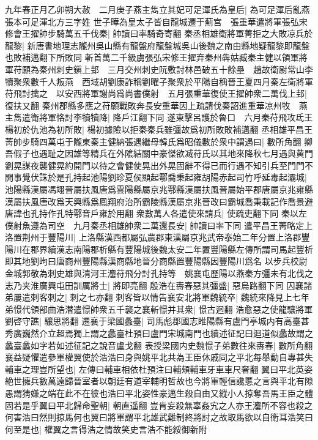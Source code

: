 九年春正月乙卯朔大赦　二月庚子燕主雋立其妃可足渾氏為皇后|{
	為可足渾后亂燕張本可足渾北方三字姓}
世子曄為皇太子皆自龍城遷于薊宫　張重華遣將軍張弘宋修會王擢帥步騎萬五千伐秦|{
	帥讀曰率騎奇寄翻}
秦丞相雄衛將軍菁拒之大敗凉兵於龍黎|{
	新唐書地理志隴州吳山縣有龍盤府龍盤城吳山後魏之南由縣地疑龍黎即龍盤也敗補邁翻下所敗同}
斬首萬二千級虜張弘宋修王擢弃秦州犇姑臧秦主健以領軍將軍苻願為秦州刺史鎭上邽　三月交州刺史阮敷討林邑破五十餘壘　趙故衛尉常山李犢聚衆數千人叛燕　西域胡劉康詐稱劉曜子聚衆於平陽自稱晉王夏四月秦左衛將軍苻飛討擒之　以安西將軍謝尚爲尚書僕射　五月張重華復使王擢帥衆二萬伐上邽|{
	復扶又翻}
秦州郡縣多應之苻願戰敗奔長安重華因上疏請伐秦詔進重華凉州牧　燕主雋遣衛將軍恪討李犢犢降|{
	降戶江翻下同}
遂東擊呂護於魯口　六月秦苻飛攻氐王楊初於仇池為初所敗|{
	楊初據險以拒秦秦兵雖彊故爲初所敗敗補邁翻}
丞相雄平昌王菁帥步騎四萬屯于隴東秦主健納張遇繼母韓氏爲昭儀數於衆中謂遇曰|{
	數所角翻}
卿吾假子也遇耻之因雄等精兵在外隂結關中豪傑欲㓕苻氏以其地來降秋七月遇與黄門劉晃謀夜襲健晃約開門以待之會健使晃出外晃固辭不得已而行遇不知引兵至門門不開事覺伏誅於是孔持起池陽劉珍夏侯顯起鄠喬秉起雍胡陽赤起司竹呼延毒起灞城|{
	池陽縣漢屬馮翊晉屬扶風唐爲雲陽縣屬京兆鄠縣漢屬扶風晉屬始平郡唐屬京兆雍縣漢屬扶風唐改爲天興縣爲鳳翔府治所霸陵縣漢屬京兆晉改曰霸城喬秉載記作喬景避唐諱也孔持作孔特鄠音戶雍於用翻}
衆數萬人各遣使來請兵|{
	使疏吏翻下同}
秦以左僕射魚遵為司空　九月秦丞相雄帥衆二萬還長安|{
	帥讀曰率下同}
遣平昌王菁略定上洛置荆州于豐陽川|{
	上洛縣漢西都屬弘農郡東漢屬京兆武帝泰始二年分置上洛郡豐陽川在郡界續漢志南陽郡析縣有豐陽城後魏太安二年置豐陽縣左傳所謂司馬起豐析即其地劉昫曰唐商州豐陽縣漢商縣地晉分商縣置豐陽縣因豐陽川爲名}
以步兵校尉金城郭敬為刺史雄與清河王灋苻飛分討孔持等　姚襄屯歷陽以燕秦方彊未有北伐之志乃夹淮廣興屯田訓厲將士|{
	將即亮翻}
殷浩在夀春惡其彊盛|{
	惡烏路翻下同}
囚襄諸弟屢遣刺客刺之|{
	刺之七亦翻}
刺客皆以情告襄安北將軍魏統卒|{
	魏統來降見上七年}
弟憬代領部曲浩潜遣憬帥衆五千襲之襄斬憬并其衆|{
	憬古迥翻}
浩愈惡之使龍驤將軍劉啓守譙|{
	驤思將翻}
遷襄于梁國蠡臺|{
	司馬彪郡國志睢陽縣有盧門亭城内有高臺甚秀廣巍然介立超焉獨上謂之蠡臺杜預曰盧門宋城南門也續述征記曰迴道似蠡故謂之蠡臺蠡如字若如述征記之說音盧戈翻}
表授梁國内史魏憬子弟數往來夀春|{
	數所角翻}
襄益疑懼遣參軍權翼使於浩浩曰身與姚平北共為王臣休戚同之平北每舉動自專甚失輔車之理豈所望也|{
	左傳曰輔車相依杜預注曰輔頰輔車牙車車尺奢翻}
翼曰平北英姿絶世擁兵數萬遠歸晉室者以朝廷有道宰輔明哲故也今將軍輕信讒慝之言與平北有隙愚謂猜嫌之端在此不在彼也浩曰平北姿性豪邁生殺自由又縱小人掠奪吾馬王臣之體固若是乎翼曰平北歸命聖朝|{
	朝直遥翻}
豈肯妄殺無辜姦宄之人亦王灋所不容也殺之何害浩曰然則掠馬何也翼曰將軍謂平北雄武難制終將討之故取馬欲以自衛耳浩笑曰何至是也|{
	權翼之言得浩之情故笑史言浩不能綏御新附}
